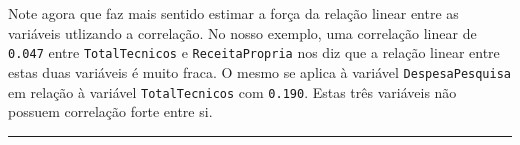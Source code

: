 \documentclass[12pt,]{style/krantz}
\theoremstyle{definition}
\theoremstyle{definition}
\theoremstyle{definition}
\theoremstyle{remark}
\begin{document}
Note agora que faz mais sentido estimar a força da relação linear entre as variáveis utlizando a correlação. No nosso exemplo, uma correlação linear de \texttt{0.047} entre \texttt{TotalTecnicos} e \texttt{ReceitaPropria} nos diz que a relação linear entre estas duas variáveis é muito fraca. O mesmo se aplica à variável \texttt{DespesaPesquisa} em relação à variável \texttt{TotalTecnicos} com \texttt{0.190}. Estas três variáveis não possuem correlação forte entre si.

\begin{center}\rule{0.5\linewidth}{\linethickness}\end{center}

\cleardoublepage

\hypertarget{appendix-apendice}{%
\appendix {}}




\backmatter
\printindex
\end{document}
